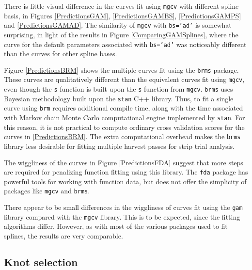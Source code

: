 \documentclass[phdcss]{SDSUThesis}
\begin{document}
There is little visual difference in the curves fit using \texttt{mgcv} with different spline basis, in Figures \ref{PredictionsGAM}, \ref{PredictionsGAMBS}, \ref{PredictionsGAMPS} and \ref{PredictionsGAMAD}. The similarity of \texttt{mgcv} with \texttt{bs='ad'} is somewhat surprising, in light of the results in Figure \ref{ComparingGAMSplines}, where the curve for the default parameters associated with \texttt{bs='ad'} was noticeably different than the curves for other spline bases.

Figure \ref{PredictionsBRM} shows the multiple curves fit using the \texttt{brms} package. These curves are qualitatively different than the equivalent curves fit using \texttt{mgcv}, even though the \texttt{s} function is built upon the \texttt{s} function from \texttt{mgcv}. \texttt{brms} uses Bayesian methodology built upon the \texttt{stan} C++ library. Thus, to fit a single curve using \texttt{brm} requires additional compile time, along with the time associated with Markov chain Monte Carlo computational engine implemented by \texttt{stan}. For this reason, it is not practical to compute ordinary cross validation scores for the curves in \ref{PredictionsBRM}. The extra computational overhead makes the \texttt{brms} library less desirable for fitting multiple harvest passes for strip trial analysis.

The wiggliness of the curves in Figure \ref{PredictionsFDA} suggest that more steps are required for penalizing function fitting using this library. The \texttt{fda} package has powerful tools for working with function data, but does not offer the simplicity of packages like \texttt{mgcv} and \texttt{brms}.

There appear to be small differences in the wiggliness of curves fit using the \texttt{gam} library compared with the \texttt{mgcv} library. This is to be expected, since the fitting algorithms differ. However, as with most of the various packages used to fit splines, the results are very comparable.

\clearpage

\subsection{Knot selection}\label{KnotSelection}
\end{document}
